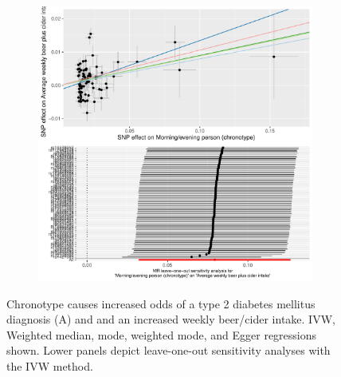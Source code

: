\documentclass{article}
\begin{document}
\begin{figure}[htbp]
\begin{subfigure}[b]{0.4\textwidth}
         \includegraphics[width=\textwidth]{Figs/Analysis2/Morning_evening_person_(chronotype)_vs_Average_weekly_beer_plus_cider_intake.Plots.pdf}
         \caption{}
         \label{beer}
     \end{subfigure}
        \caption{Chronotype causes increased odds of a type 2 diabetes mellitus diagnosis (A) and and an increased weekly beer/cider intake. IVW, Weighted median, mode, weighted mode, and Egger regressions shown. Lower panels depict leave-one-out sensitivity analyses with the IVW method.}
        \label{t2dmalcohol}
\end{figure}
\end{document}
